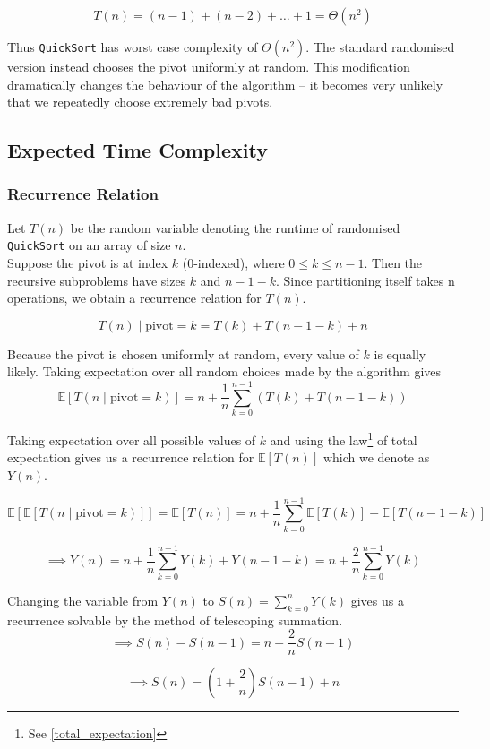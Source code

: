 \[
T(n)=
(n-1)+(n-2)+\dots+1
=
\Theta(n^2)
\]

\noindent Thus \texttt{QuickSort} has worst case complexity of $\Theta(n^2)$. The standard randomised 
version instead chooses the pivot uniformly at random. This modification dramatically changes 
the behaviour of the algorithm -- it becomes very unlikely that we 
repeatedly choose extremely bad pivots.

\subsection{Expected Time Complexity}

\subsubsection*{Recurrence Relation}
Let \(T(n)\) be the random variable denoting the runtime of randomised \texttt{QuickSort} on 
an array of size \(n\).\\


\noindent Suppose the pivot is at index \(k\) (0-indexed), where \(0\le k\le n-1\). 
Then the recursive subproblems have sizes \(k\) and \(n-1-k\). Since partitioning itself 
takes n operations, we obtain a recurrence relation for \(T(n)\). 

\[
T(n)\mid \text{pivot} = k
=
T(k)+T(n-1-k)+n
\]

\noindent Because the pivot is chosen uniformly at random, every value of \(k\) is equally likely. Taking expectation 
over all random choices made by the algorithm gives
\[
\mathbb E[T(n \mid \text{pivot} = k)]
=
n
+
\frac{1}{n}\sum_{k=0}^{n-1}
\left(
T(k)+T(n-1-k)
\right)
\]

Taking expectation over all possible values of \(k\) and using the law\footnote{See \autoref{total_expectation}} of total 
expectation gives us a recurrence relation for $\mathbb E[T(n)]$ which we denote as $Y(n)$.

\[
\mathbb E[\mathbb E[T(n \mid \text{pivot} = k)]] = 
\mathbb E[T(n)]=n+\frac{1}{n}\sum_{k=0}^{n-1}\mathbb E[T(k)] + \mathbb E[T(n-1-k)]
\]

\[
\implies 
Y(n)
=
n+\frac{1}{n}\sum_{k=0}^{n-1}Y(k)+Y(n-1-k)
=
n+\frac{2}{n}\sum_{k=0}^{n-1}Y(k)
\]

\noindent Changing the variable from $Y(n)$ to $S(n)=\sum_{k=0}^{n}Y(k)$ gives us a recurrence solvable by the 
method of telescoping summation.
\[
\implies
S(n)-S(n-1)
=
n+\frac{2}{n}S(n-1)
\]

\[
\implies
S(n)
=
\left(1+\frac{2}{n}\right)S(n-1)+n
\]

